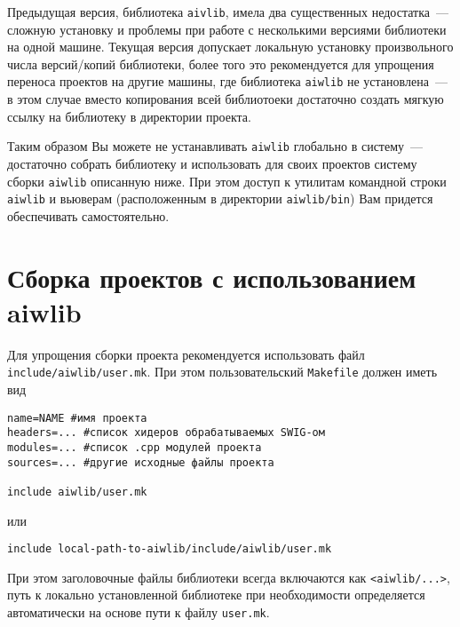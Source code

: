 Предыдущая версия, библиотека {\tt aivlib}, имела два существенных недостатка~--- сложную установку и проблемы при
работе с несколькими версиями библиотеки на одной машине. Текущая версия допускает локальную установку
произвольного числа версий/копий библиотеки, более того это рекомендуется для  
упрощения переноса проектов на другие машины, где библиотека \verb'aiwlib' не установлена~---
в этом случае вместо копирования всей библиотоеки достаточно создать мягкую ссылку на библиотеку в директории проекта.

Таким образом Вы можете не устанавливать \verb'aiwlib' глобально в
систему~--- достаточно собрать библиотеку и использовать для своих
проектов систему сборки \verb'aiwlib' описанную ниже. При этом доступ
к утилитам командной строки \verb'aiwlib' и вьюверам (расположенным в директории
\verb'aiwlib/bin') Вам придется обеспечивать самостоятельно.  

\section{Сборка проектов с использованием aiwlib}
Для упрощения сборки проекта рекомендуется использовать файл \verb'include/aiwlib/user.mk'.
При этом пользовательский \verb'Makefile' должен иметь вид
\begin{verbatim}
name=NAME #имя проекта
headers=... #список хидеров обрабатываемых SWIG-ом
modules=... #список .cpp модулей проекта
sources=... #другие исходные файлы проекта

include aiwlib/user.mk
\end{verbatim}
или
\begin{verbatim}
include local-path-to-aiwlib/include/aiwlib/user.mk
\end{verbatim}
При этом заголовочные файлы библиотеки всегда включаются как \verb'<aiwlib/...>',
путь к локально установленной библиотеке при необходимости определяется автоматически на основе пути к файлу \verb'user.mk'.

